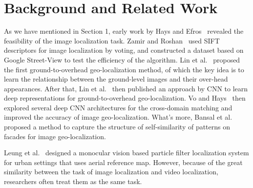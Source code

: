 \section{Background and Related Work}
\label{sec:related}
As we have mentioned in Section 1, early work by Hays and Efros~\cite{hays2008im2gps} revealed the feasibility of the image localization task. 
Zamir and Roshan~\cite{zamir2010accurate} used SIFT descriptors for image localization by voting, and constructed a dataset based on Google Street-View to test the efficiency of the algorithm. 
Lin et al.~\cite{lin2013cross} proposed the first ground-to-overhead geo-localization method, of which the key idea is to learn the relationship between the ground-level images and their over-head appearances. 
After that, Lin et al.~\cite{lin2015learning} then published an approach by CNN to learn deep representations for ground-to-overhead geo-localization. 
Vo and Hays~\cite{vo2016localizing} then explored several deep CNN architectures for the cross-domain matching and improved the accuracy of image geo-localization. 
What's more, Bansal et al.~\cite{bansal2012ultra} proposed a method to capture the structure of self-similarity of patterns on facades for image geo-localization.

Leung et al.~\cite{leung2008localization} designed a monocular vision based particle filter localization system for urban settings that uses aerial reference map. 
However, because of the great similarity between the task of image localization and video localization, researchers often treat them as the same task.

